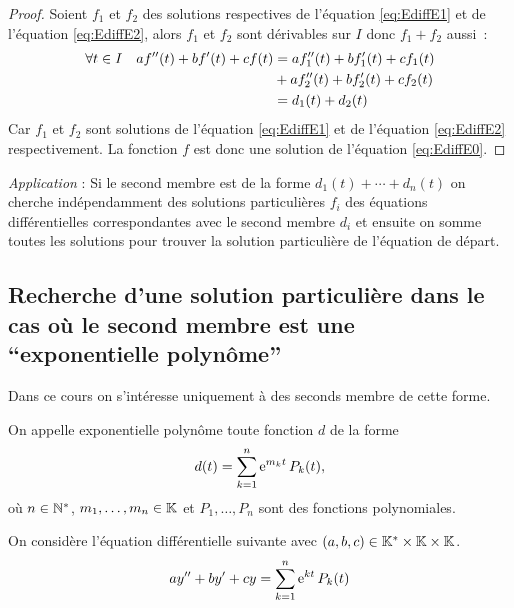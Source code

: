 \begin{proof}
    Soient \(f_1\) et \(f_2\) des solutions respectives de l'équation 
    \eqref{eq:EdiffE1} et de l'équation \eqref{eq:EdiffE2}, alors \(f_1\) et 
    \(f_2\) sont dérivables sur \(I\) donc \(f_1 + f_2\) aussi~:
    \begin{align}
        \forall t \in I \quad af''(t) + bf'(t) + cf(t)& = af_1''(t) + bf_1'(t) + 
        cf_1(t) \notag \\
                                                      &+ af_2''(t) + bf_2'(t) + 
        cf_2(t)\\ & = d_1(t) + d_2(t)
    \end{align}
    Car \(f_1\) et \(f_2\) sont solutions de l'équation \eqref{eq:EdiffE1} et de 
    l'équation \eqref{eq:EdiffE2} respectivement. La fonction \(f\) est donc une 
    solution de l'équation \eqref{eq:EdiffE0}.
\end{proof}

\emph{Application} : Si le second membre est de la forme \(d_1(t)+ \dotsb  + 
d_n(t)\) on cherche indépendamment des solutions particulières \(f_i\) des 
équations différentielles correspondantes avec le second membre \(d_i\) et 
ensuite on somme toutes les solutions pour trouver la solution particulière de 
l'équation de départ.

\subsection{Recherche d'une solution particulière dans le cas où le second 
membre est une ``exponentielle polynôme''}
\label{subsec:recherchesolutionpartexppol}

Dans ce cours on s'intéresse uniquement à des seconds membre de cette forme.

\begin{defdef}
    On appelle exponentielle polynôme toute fonction \(d\) de la forme
    \begin{equation}
        d(t) = \sum_{k = 1}^{n} \operatorname{e}^{m_k t} P_k (t),
    \end{equation}
    où \(n \in \mathbb{N}^*\), \(m_1, \ldots, m_n \in \mathbb{K}\) et \( P_1, \ldots, P_n\) sont 
    des fonctions polynomiales.
\end{defdef}
On considère l'équation différentielle  suivante avec \((a,b,c) \in 
\mathbb{K}^{*}\times\mathbb{K}\times\mathbb{K}\).
\begin{equation}
  \label{eq:Ediff4}
  ay'' + by' + cy = \sum_{k = 1}^{n} \operatorname{e}^{kt} P_k(t)
\end{equation}

